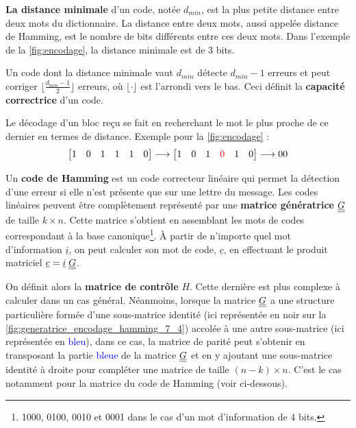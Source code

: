 \documentclass [a4paper, 11pt] {article}
\begin{document}
    \textbf{La distance minimale} d'un code, notée $d_{min}$, est la plus petite distance entre deux mots du dictionnaire. La distance entre deux mots, aussi appelée distance de Hamming, est le nombre de bits différents entre ces deux mots. Dans l'exemple de la \autoref{fig:encodage}, la distance minimale est de 3 bits.
    
    Un code dont la distance minimale vaut $d_{min}$ détecte $d_{min}-1$ erreurs et peut corriger $\lfloor\frac{d_{min}-1}{2} \rfloor$ erreurs, où $\lfloor \cdot \rfloor$ est l'arrondi vers le bas. Ceci définit la \textbf{capacité correctrice} d'un code.
    
    Le décodage d'un bloc reçu se fait en recherchant le mot le plus proche de ce dernier en termes de distance. Exemple pour la \autoref{fig:encodage} :
    \begin{equation}
        \begin{bmatrix}
            1 & 0 & 1 & 1 & 1 & 0
        \end{bmatrix}
        \longrightarrow
        \begin{bmatrix}
            1 & 0 & 1 & \color{red} 0 & 1 & 0
        \end{bmatrix}
        \longrightarrow 00
    \end{equation}
    
    Un \textbf{code de Hamming} est un code correcteur linéaire qui permet la détection d'une erreur si elle n'est présente que sur une lettre du message. Les codes linéaires peuvent être complètement représenté par une \textbf{matrice génératrice} $\underline{\underline{G}}$ de taille $k \times n$. Cette matrice s'obtient en assemblant les mots de codes correspondant à la base canonique\footnote{1000, 0100, 0010 et 0001 dans le cas d'un mot d'information de 4 bits.}. À partir de n'importe quel mot d'information $\underline{i}$, on peut calculer son mot de code, $\underline{c}$, en effectuant le produit matriciel $\underline{c} = \underline{i} \; \underline{\underline{G}}$.
    
    \pagebreak
    \pagestyle{nextpages}
    
    On définit alors la \textbf{matrice de contrôle} $H$. Cette dernière est plus complexe à calculer dans un cas général. Néanmoins, lorsque la matrice $\underline{\underline{G}}$ a une structure particulière formée d'une sous-matrice identité (ici représentée en noir sur la \autoref{fig:generatrice_encodage_hamming_7_4}) accolée à une autre sous-matrice (ici représentée en \textcolor{blue}{bleu}), dans ce cas, la matrice de parité  peut s'obtenir en transposant la partie \textcolor{blue}{bleue} de la matrice $\underline{\underline{G}}$ et en y ajoutant une sous-matrice identité à droite pour compléter une matrice de taille $(n-k) \times n$. C'est le cas notamment pour la matrice du code de Hamming (voir ci-dessous).
    
\end{document}
